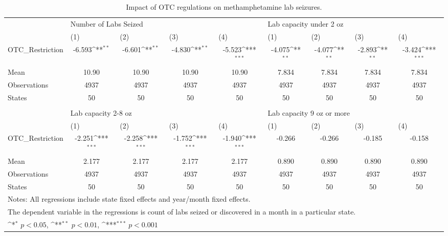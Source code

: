 \documentclass[
  11pt,
]{article}
\begin{document}
\begin{table}[!htbp]\centering
\def\sym#1{\ifmmode^{#1}\else\(^{#1}\)\fi}
\caption{Impact of OTC regulations on methamphetamine lab seizures.}
\begin{tabular}{l*{8}{c}}
\midrule\midrule
\multicolumn{1}{l}{ } & \multicolumn{4}{l}{Number of Labs Seized } & \multicolumn{4}{l}{ Lab capacity under 2 oz \label{fe-results}}\\ \cmidrule(l{3pt}r{3pt}){2-5} \cmidrule(l{3pt}r{3pt}){6-9}
 &\multicolumn{1}{l}{(1)}&\multicolumn{1}{l}{(2)}&\multicolumn{1}{l}{(3)}&\multicolumn{1}{l}{(4)}&\multicolumn{1}{l}{(1)}&\multicolumn{1}{l}{(2)}&\multicolumn{1}{l}{(3)}&\multicolumn{1}{l}{(4)}\\
\midrule
OTC\_Restriction& -6.593\sym{**} & -6.601\sym{**} & -4.830\sym{**} & -5.523\sym{***}& -4.075\sym{**} & -4.077\sym{**} & -2.893\sym{**} & -3.424\sym{***}\\
\midrule
Mean & 10.90 & 10.90 & 10.90 & 10.90 & 7.834 & 7.834 & 7.834 & 7.834 \\
Observations& 4937 & 4937 & 4937 & 4937 & 4937 & 4937 & 4937 & 4937 \\
States & 50 & 50 & 50 & 50 & 50 & 50 & 50 & 50 \\
\midrule\midrule
\vspace{0.5cm}\\
\multicolumn{1}{l}{ } & \multicolumn{4}{l}{Lab capacity 2-8 oz } & \multicolumn{4}{l}{ Lab capacity 9 oz or more }\\ \cmidrule(l{3pt}r{3pt}){2-5} \cmidrule(l{3pt}r{3pt}){6-9}
 &\multicolumn{1}{l}{(1)}&\multicolumn{1}{l}{(2)}&\multicolumn{1}{l}{(3)}&\multicolumn{1}{l}{(4)}&\multicolumn{1}{l}{(1)}&\multicolumn{1}{l}{(2)}&\multicolumn{1}{l}{(3)}&\multicolumn{1}{l}{(4)}\\
\midrule
OTC\_Restriction& -2.251\sym{***}& -2.258\sym{***}& -1.752\sym{***}& -1.940\sym{***}& -0.266 & -0.266 & -0.185 & -0.158 \\
\midrule
Mean & 2.177 & 2.177 & 2.177 & 2.177 & 0.890 & 0.890 & 0.890 & 0.890 \\
Observations& 4937 & 4937 & 4937 & 4937 & 4937 & 4937 & 4937 & 4937 \\
States & 50 & 50 & 50 & 50 & 50 & 50 & 50 & 50 \\
\midrule\midrule
\multicolumn{9}{l}{\footnotesize Notes: All regressions include state fixed effects and year/month fixed effects.}\\
\multicolumn{9}{l}{\footnotesize The dependent variable in the regressions is count of labs seized or discovered in a month in a particular state.}\\
\multicolumn{9}{l}{\footnotesize \sym{*} \(p<0.05\), \sym{**} \(p<0.01\), \sym{***} \(p<0.001\)}\\
\end{tabular}
\end{table}
\end{document}

